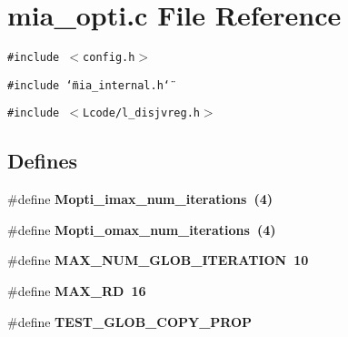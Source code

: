 \section{mia\_\-opti.c File Reference}
\label{mia__opti_8c}
{\tt \#include $<$config.h$>$}\par
{\tt \#include \char`\"{}mia\_\-internal.h\char`\"{}}\par
{\tt \#include $<$Lcode/l\_\-disjvreg.h$>$}\par
\subsection*{Defines}
\begin{CompactItemize}
\item 
\#define \bf{Mopti\_\-imax\_\-num\_\-iterations}~(4)
\item 
\#define \bf{Mopti\_\-omax\_\-num\_\-iterations}~(4)
\item 
\#define \bf{MAX\_\-NUM\_\-GLOB\_\-ITERATION}~10
\item 
\#define \bf{MAX\_\-RD}~16
\item 
\#define \bf{TEST\_\-GLOB\_\-COPY\_\-PROP}
\end{CompactItemize}
